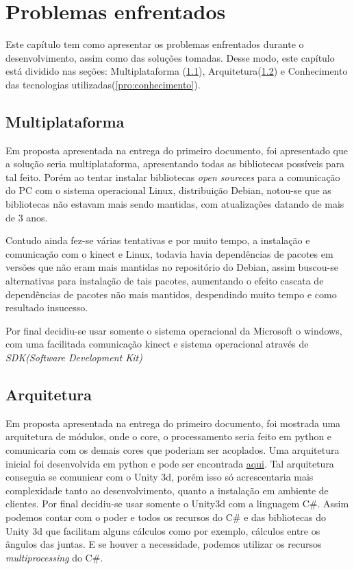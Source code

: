 \chapter[Problemas enfrentados]{Problemas enfrentados}
  Este capítulo tem como apresentar os problemas enfrentados durante o desenvolvimento,
  assim como das soluções tomadas. Desse modo, este
capítulo está dividido nas seções: Multiplataforma (\ref{pro:Multiplataforma}),
Arquitetura(\ref{pro:arquitetura}) e Conhecimento das tecnologias utilizadas(\ref{pro:conhecimento}).
\section{Multiplataforma}\label{pro:Multiplataforma}
  Em proposta apresentada na entrega do primeiro documento, foi apresentado que a solução seria multiplataforma,
apresentando todas as bibliotecas possíveis para tal feito. Porém ao tentar instalar bibliotecas \textit{open soureces}
para a comunicação do PC com o sistema operacional Linux, distribuição Debian, notou-se que as bibliotecas não
estavam mais sendo mantidas, com atualizações datando de mais de 3 anos.

  Contudo ainda fez-se várias tentativas e por muito tempo,
a instalação e comunicação com o kinect e Linux, todavia havia dependências de pacotes em versões que não eram mais
mantidas no repositório do Debian, assim buscou-se alternativas para instalação de tais pacotes, aumentando o efeito cascata
de dependências de pacotes não mais mantidos, despendindo muito tempo e como resultado insucesso.

  Por final decidiu-se usar somente o sistema operacional da Microsoft o windows, com uma facilitada comunicação
kinect e sistema operacional através de \textit{SDK(Software Development Kit)}


\section{Arquitetura}\label{pro:arquitetura}
  Em proposta apresentada na entrega do primeiro documento, foi mostrada uma arquitetura de módulos, onde o core,
o processamento seria feito em python e comunicaria com os demais cores que poderiam ser acoplados. Uma arquitetura
inicial foi desenvolvida em python e pode ser encontrada \href{https://gitlab.com/ricardogtx/tcc2}{aqui}. Tal arquitetura conseguia
se comunicar com o Unity 3d, porém isso só acrescentaria mais complexidade tanto ao desenvolvimento, quanto a
instalação em ambiente de clientes.
  Por final decidiu-se usar somente o Unity3d com a linguagem C\#. Assim podemos contar com o poder e todos os recursos do C\#
 e das bibliotecas do Unity 3d que facilitam alguns cálculos como por exemplo,
 cálculos entre os ângulos das juntas. E se houver a necessidade, podemos utilizar os recursos
\textit{multiprocessing} do C\#.

